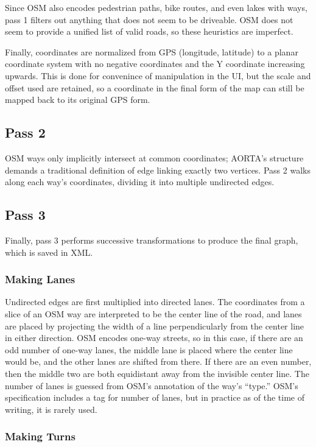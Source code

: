 \documentclass[12pt]{article}
\begin{document}
Since OSM also encodes pedestrian paths, bike routes, and even lakes with ways,
pass 1 filters out anything that does not seem to be driveable. OSM does not
seem to provide a unified list of valid roads, so these heuristics are
imperfect.

Finally, coordinates are normalized from GPS (longitude, latitude) to a planar
coordinate system with no negative coordinates and the Y coordinate increasing
upwards. This is done for convenince of manipulation in the UI, but the scale
and offset used are retained, so a coordinate in the final form of the map can
still be mapped back to its original GPS form.

\subsection{Pass 2}

OSM ways only implicitly intersect at common coordinates; AORTA's structure
demands a traditional definition of edge linking exactly two vertices. Pass 2
walks along each way's coordinates, dividing it into multiple undirected edges.

\subsection{Pass 3}

Finally, pass 3 performs successive transformations to produce the final graph,
which is saved in XML.

\subsubsection{Making Lanes}

Undirected edges are first multiplied into directed lanes. The coordinates from
a slice of an OSM way are interpreted to be the center line of the road, and
lanes are placed by projecting the width of a line perpendicularly from the
center line in either direction. OSM encodes one-way streets, so in this case,
if there are an odd number of one-way lanes, the middle lane is placed where the
center line would be, and the other lanes are shifted from there. If there are
an even number, then the middle two are both equidistant away from the invisible
center line. The number of lanes is guessed from OSM's annotation of the way's
``type.'' OSM's specification includes a tag for number of lanes, but in
practice as of the time of writing, it is rarely used.

\subsubsection{Making Turns}
\end{document}
